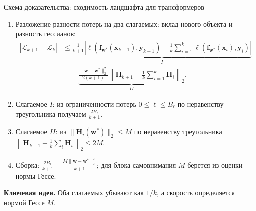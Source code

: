\documentclass[10pt,pdf,hyperref={unicode}]{beamer}
\newcommand{\key}[1]{\textbf{\color{darkgreen}#1}}
\begin{document}
\begin{frame}{Схема доказательства: сходимость ландшафта для трансформеров}
\justifying
\small
\begin{enumerate}
    \item Разложение разности потерь на два слагаемых: вклад нового объекта и разность гессианов:
    \[
        \begin{aligned}
        \left|\mathcal{L}_{k+1}-\mathcal{L}_k\right| &\leqslant \underbrace{\frac{1}{k+1}\left|\ell(\mathbf{f}_{\mathbf{w}^*}(\mathbf{x}_{k+1}),\mathbf{y}_{k+1})-\frac{1}{k}\sum_{i=1}^k\ell(\mathbf{f}_{\mathbf{w}^*}(\mathbf{x}_i),\mathbf{y}_i)\right|}_{I} \\
        &\quad + \underbrace{\frac{\|\mathbf{w}-\mathbf{w}^*\|_2^2}{2(k+1)}\left\|\mathbf{H}_{k+1}-\frac{1}{k}\sum_{i=1}^k\mathbf{H}_i\right\|_2}_{II}.
        \end{aligned}
    \]
    \item Слагаемое $I$: из ограниченности потерь $0\leqslant\ell\leqslant B_\ell$ по неравенству треугольника получаем $\frac{2B_\ell}{k+1}$.
    \item Слагаемое $II$: из $\|\mathbf{H}_i(\mathbf{w}^*)\|_2\leqslant M$ по неравенству треугольника $\left\|\mathbf{H}_{k+1}-\frac{1}{k}\sum_i\mathbf{H}_i\right\|_2 \leqslant 2M$.
    \item Сборка: $\frac{2B_\ell}{k+1}+\frac{M\|\mathbf{w}-\mathbf{w}^*\|_2^2}{k+1}$; для блока самовнимания $M$ берется из оценки нормы Гессе.
\end{enumerate}

\vspace{0.15em}
\key{Ключевая идея.} Оба слагаемых убывают как $1/k$, а скорость определяется нормой Гессе $M$.
\end{frame}
\end{document}
